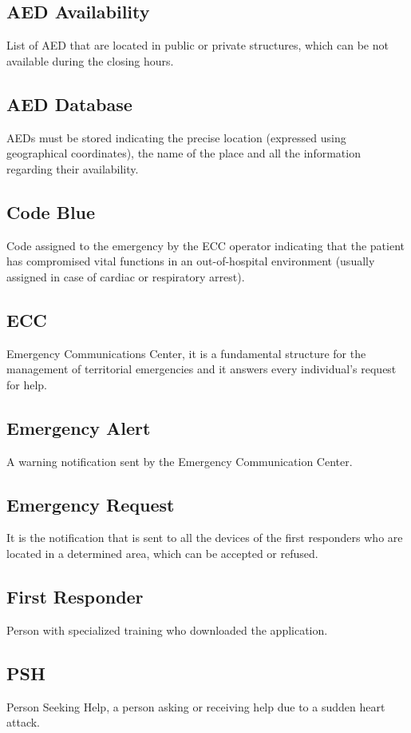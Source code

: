 \documentclass[11pt,a4paper]{article}
\begin{document}
\subsection*{AED Availability}
List of AED that are located in public or private structures, which can be not available during the closing hours.

\subsection*{AED Database}
AEDs must be stored indicating the precise location (expressed using geographical coordinates), the name of the place and all the information regarding their availability.

\subsection*{Code Blue}
Code assigned to the emergency by the ECC operator indicating that the patient has compromised vital functions in an out-of-hospital environment (usually assigned in case of cardiac or respiratory arrest).

\subsection*{ECC}
Emergency Communications Center, it is a fundamental structure for the management of territorial emergencies and it answers every individual's request for help.

\subsection*{Emergency Alert}
A warning notification sent by the Emergency Communication Center.

\subsection*{Emergency Request}
It is the notification that is sent to all the devices of the first responders who are located in a determined area, which can be accepted or refused.

\subsection*{First Responder}
Person with specialized training who downloaded the application.

\subsection*{PSH}
Person Seeking Help, a person asking or receiving help due to a sudden heart attack.
\end{document}
